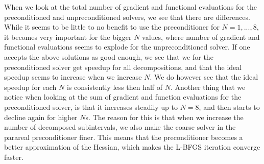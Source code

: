 When we look at the total number of gradient and functional evaluations for the preconditioned and unpreconditioned solvers, we see that there are differences. While it seems to be little to no benefit to use the preconditioner for $N=1,...,8$, it becomes very important for the bigger $N$ values, where number of gradient and functional evaluations seems to explode for the unpreconditioned solver. If one accepts the above solutions as good enough, we see that we for the preconditioned solver get speedup for all decompositions, and that the ideal speedup seems to increase when we increase $N$. We do however see that the ideal speedup for each $N$ is consistently less then half of $N$. Another thing that we notice when looking at the sum of gradient and function evaluations for the preconditioned solver, is that it increases steadily up to $N=8$, and then starts to decline again for higher $N$s. The reason for this is that when we increase the number of decomposed subintervals, we also make the coarse solver in the parareal preconditioner finer. This means that the preconditioner becomes a better approximation of the Hessian, which makes the L-BFGS iteration converge faster. 
